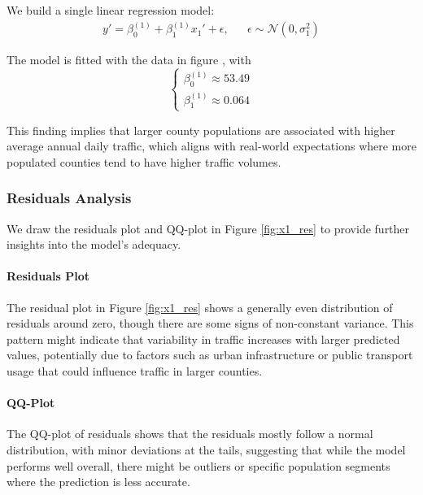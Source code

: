 We build a single linear regression model:
\begin{equation}
\begin{aligned}
y' = \beta_0^{(1)} + \beta_1^{(1)} x_1' + \epsilon, && \epsilon\sim\mathcal{N}(0, \sigma_1^2)
\end{aligned}
\end{equation}


The model is fitted with the data in figure , with 
\begin{equation}
    \begin{cases}
        \beta_0^{(1)}\approx 53.49\\
        \beta_1^{(1)}\approx 0.064
    \end{cases}
\end{equation}

This finding implies that larger county populations are associated with higher average annual daily traffic, which aligns with real-world expectations where more populated counties tend to have higher traffic volumes.

\subsubsection{Residuals Analysis}

We draw the residuals plot and QQ-plot in Figure \ref{fig:x1_res} to provide further insights into the model's adequacy.

\paragraph{Residuals Plot} The residual plot in Figure \ref{fig:x1_res} shows a generally even distribution of residuals around zero, though there are some signs of non-constant variance. This pattern might indicate that variability in traffic increases with larger predicted values, potentially due to factors such as urban infrastructure or public transport usage that could influence traffic in larger counties.

\paragraph{QQ-Plot} The QQ-plot of residuals shows that the residuals mostly follow a normal distribution, with minor deviations at the tails, suggesting that while the model performs well overall, there might be outliers or specific population segments where the prediction is less accurate.


